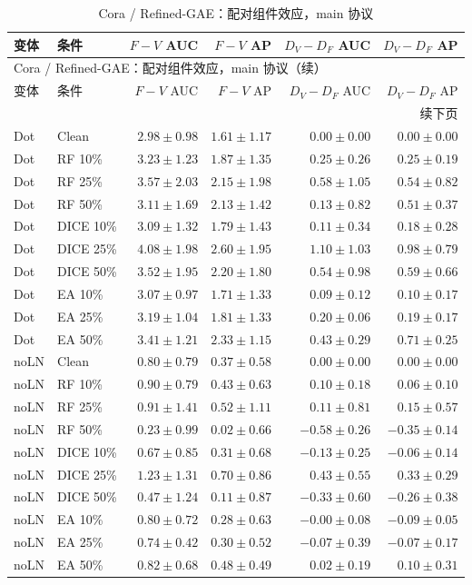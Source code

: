 {\footnotesize
\setlength{\tabcolsep}{3.2pt}
\renewcommand{\arraystretch}{1.10}
\begin{longtable}{llrrrr}
\caption{Cora / Refined-GAE：配对组件效应，main 协议}\\
\toprule
变体 & 条件 & $F-V$ AUC & $F-V$ AP & $D_V-D_F$ AUC & $D_V-D_F$ AP \\
\midrule
\endfirsthead
\multicolumn{6}{l}{Cora / Refined-GAE：配对组件效应，main 协议（续）}\\
\toprule
变体 & 条件 & $F-V$ AUC & $F-V$ AP & $D_V-D_F$ AUC & $D_V-D_F$ AP \\
\midrule
\endhead
\midrule\multicolumn{6}{r}{续下页}\\
\endfoot
\bottomrule
\endlastfoot
Dot & Clean & $2.98\pm0.98$ & $1.61\pm1.17$ & $0.00\pm0.00$ & $0.00\pm0.00$ \\
Dot & RF 10\% & $3.23\pm1.23$ & $1.87\pm1.35$ & $0.25\pm0.26$ & $0.25\pm0.19$ \\
Dot & RF 25\% & $3.57\pm2.03$ & $2.15\pm1.98$ & $0.58\pm1.05$ & $0.54\pm0.82$ \\
Dot & RF 50\% & $3.11\pm1.69$ & $2.13\pm1.42$ & $0.13\pm0.82$ & $0.51\pm0.37$ \\
Dot & DICE 10\% & $3.09\pm1.32$ & $1.79\pm1.43$ & $0.11\pm0.34$ & $0.18\pm0.28$ \\
Dot & DICE 25\% & $4.08\pm1.98$ & $2.60\pm1.95$ & $1.10\pm1.03$ & $0.98\pm0.79$ \\
Dot & DICE 50\% & $3.52\pm1.95$ & $2.20\pm1.80$ & $0.54\pm0.98$ & $0.59\pm0.66$ \\
Dot & EA 10\% & $3.07\pm0.97$ & $1.71\pm1.33$ & $0.09\pm0.12$ & $0.10\pm0.17$ \\
Dot & EA 25\% & $3.19\pm1.04$ & $1.81\pm1.33$ & $0.20\pm0.06$ & $0.19\pm0.17$ \\
Dot & EA 50\% & $3.41\pm1.21$ & $2.33\pm1.15$ & $0.43\pm0.29$ & $0.71\pm0.25$ \\
noLN & Clean & $0.80\pm0.79$ & $0.37\pm0.58$ & $0.00\pm0.00$ & $0.00\pm0.00$ \\
noLN & RF 10\% & $0.90\pm0.79$ & $0.43\pm0.63$ & $0.10\pm0.18$ & $0.06\pm0.10$ \\
noLN & RF 25\% & $0.91\pm1.41$ & $0.52\pm1.11$ & $0.11\pm0.81$ & $0.15\pm0.57$ \\
noLN & RF 50\% & $0.23\pm0.99$ & $0.02\pm0.66$ & $-0.58\pm0.26$ & $-0.35\pm0.14$ \\
noLN & DICE 10\% & $0.67\pm0.85$ & $0.31\pm0.68$ & $-0.13\pm0.25$ & $-0.06\pm0.14$ \\
noLN & DICE 25\% & $1.23\pm1.31$ & $0.70\pm0.86$ & $0.43\pm0.55$ & $0.33\pm0.29$ \\
noLN & DICE 50\% & $0.47\pm1.24$ & $0.11\pm0.87$ & $-0.33\pm0.60$ & $-0.26\pm0.38$ \\
noLN & EA 10\% & $0.80\pm0.72$ & $0.28\pm0.63$ & $-0.00\pm0.08$ & $-0.09\pm0.05$ \\
noLN & EA 25\% & $0.74\pm0.42$ & $0.30\pm0.52$ & $-0.07\pm0.39$ & $-0.07\pm0.17$ \\
noLN & EA 50\% & $0.82\pm0.68$ & $0.48\pm0.49$ & $0.02\pm0.19$ & $0.10\pm0.31$ \\
\end{longtable}
}


